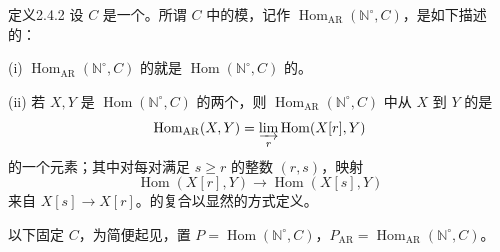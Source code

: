 \begin{SGAresult}{定义}{2.4.2}
设 $C$ 是一个。所谓 $C$ 中的模，记作 $\operatorname{Hom}_{\mathrm{AR}}(\mathbb N^\circ,C)$，是如下描述的：

(i) $\operatorname{Hom}_{\mathrm{AR}}(\mathbb N^\circ,C)$ 的就是 $\operatorname{Hom}(\mathbb N^\circ,C)$ 的。

(ii) 若 $X,Y$ 是 $\operatorname{Hom}(\mathbb N^\circ,C)$ 的两个，则 $\operatorname{Hom}_{\mathrm{AR}}(\mathbb N^\circ,C)$ 中从 $X$ 到 $Y$ 的是
\[
\operatorname{Hom}_{\mathrm{AR}}(X,Y)=\varinjlim_r\operatorname{Hom}(X[r],Y)
\]
的一个元素；其中对每对满足 $s\geq r$ 的整数 $(r,s)$，映射
\[
\operatorname{Hom}(X[r],Y)\longrightarrow\operatorname{Hom}(X[s],Y)
\]
来自 $X[s]\to X[r]$。的复合以显然的方式定义。
\end{SGAresult}
以下固定 $C$，为简便起见，置 $P=\operatorname{Hom}(\mathbb N^\circ,C)$，$P_{\mathrm{AR}}=\operatorname{Hom}_{\mathrm{AR}}(\mathbb N^\circ,C)$。

